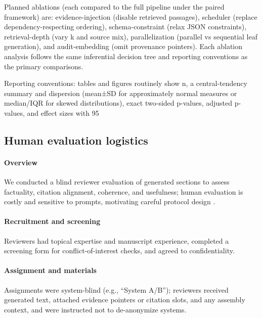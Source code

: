 \documentclass{article}%
\begin{document}
Planned ablations (each compared to the full pipeline under the paired framework) are: evidence-injection (disable retrieved passages), scheduler (replace dependency-respecting ordering), schema-constraint (relax JSON constraints), retrieval-depth (vary k and source mix), parallelization (parallel vs sequential leaf generation), and audit-embedding (omit provenance pointers). Each ablation analysis follows the same inferential decision tree and reporting conventions as the primary comparisons.

Reporting conventions: tables and figures routinely show n, a central-tendency summary and dispersion (mean±SD for approximately normal measures or median/IQR for skewed distributions), exact two-sided p-values, adjusted p-values, and effect sizes with 95%

%
\subsection{Human evaluation logistics}%


%
\paragraph{Overview} We conducted a blind reviewer evaluation of generated sections to assess factuality, citation alignment, coherence, and usefulness; human evaluation is costly and sensitive to prompts, motivating careful protocol design \cite{web_healey_2025_developing_a_framework_to_support_human_evaluati,web_h_m_l_inen_2021_the_great_misalignment_problem_in_human_evaluati}.

\paragraph{Recruitment and screening} Reviewers had topical expertise and manuscript experience, completed a screening form for conflict-of-interest checks, and agreed to confidentiality.

\paragraph{Assignment and materials} Assignments were system-blind (e.g., “System A/B”); reviewers received generated text, attached evidence pointers or citation slots, and any assembly context, and were instructed not to de-anonymize systems.
\end{document}
